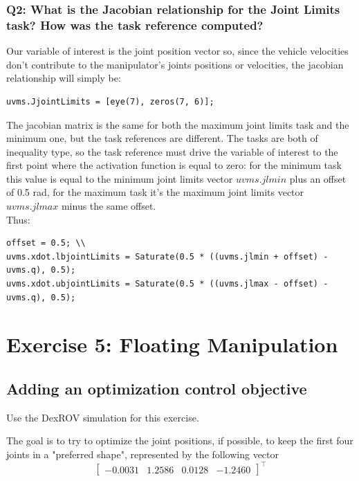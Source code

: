 \documentclass{article}
\begin{document}
\subsubsection{Q2: What is the Jacobian relationship for the Joint Limits task? How was the task reference computed?}
Our variable of interest is the joint position vector so, since the vehicle velocities don't contribute to the manipulator's joints positions or velocities, the jacobian relationship will simply be:
\begin{lstlisting}
uvms.JjointLimits = [eye(7), zeros(7, 6)];
\end{lstlisting}
The jacobian matrix is the same for both the maximum joint limits task and the minimum one, but the task references are different. The tasks are both of inequality type, so the task reference must drive the variable of interest to the first point where the activation function is equal to zero: for the minimum task this value is equal to the minimum joint limits vector $ uvms.jlmin $ plus an offset of 0.5 rad, for the maximum task it's the maximum joint limits vector $ uvms.jlmax $ minus the same offset. \\

Thus:
\begin{lstlisting}
offset = 0.5; \\
uvms.xdot.lbjointLimits = Saturate(0.5 * ((uvms.jlmin + offset) - uvms.q), 0.5);
uvms.xdot.ubjointLimits = Saturate(0.5 * ((uvms.jlmax - offset) - uvms.q), 0.5);
\end{lstlisting}

\clearpage



\section{Exercise 5: Floating Manipulation}
\subsection{Adding an optimization control objective}
Use the DexROV simulation for this exercise.

The goal is to try to optimize the joint positions, if possible, to keep the first four joints in a "preferred shape", represented by the following vector
\begin{displaymath}
\begin{bmatrix}-0.0031 & 1.2586 & 0.0128 & -1.2460 \end{bmatrix}^\top
\end{displaymath}
\end{document}
